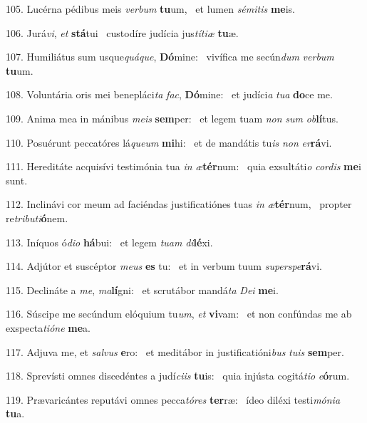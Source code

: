 105. Lucérna pédibus meis \textit{ver}\textit{bum} \textbf{tu}um, \ast\  et lumen \textit{sé}\textit{mi}\textit{tis} \textbf{me}is.\

106. Jurá\textit{vi}, \textit{et} \textbf{stá}tui \ast\  custodíre judícia jus\textit{tí}\textit{ti}\textit{æ} \textbf{tu}æ.\

107. Humiliátus sum usque\textit{quá}\textit{que}, \textbf{Dó}mine: \ast\  vivífica me secún\textit{dum} \textit{ver}\textit{bum} \textbf{tu}um.\

108. Voluntária oris mei benepláci\textit{ta} \textit{fac}, \textbf{Dó}mine: \ast\  et judíci\textit{a} \textit{tu}\textit{a} \textbf{do}ce me.\

109. Anima mea in mánibus \textit{me}\textit{is} \textbf{sem}per: \ast\  et legem tuam \textit{non} \textit{sum} \textit{ob}\textbf{lí}tus.\

110. Posuérunt peccatóres lá\textit{que}\textit{um} \textbf{mi}hi: \ast\  et de mandátis tu\textit{is} \textit{non} \textit{er}\textbf{rá}vi.\

111. Hereditáte acquisívi testimónia tua \textit{in} \textit{æ}\textbf{tér}num: \ast\  quia exsultáti\textit{o} \textit{cor}\textit{dis} \textbf{me}i sunt.\

112. Inclinávi cor meum ad faciéndas justificatiónes tuas \textit{in} \textit{æ}\textbf{tér}num, \ast\  propter re\textit{tri}\textit{bu}\textit{ti}\textbf{ó}nem.\

113. Iníquos ó\textit{di}\textit{o} \textbf{há}bui: \ast\  et legem \textit{tu}\textit{am} \textit{di}\textbf{lé}xi.\

114. Adjútor et suscéptor \textit{me}\textit{us} \textbf{es} tu: \ast\  et in verbum tuum \textit{su}\textit{per}\textit{spe}\textbf{rá}vi.\

115. Declináte a \textit{me}, \textit{ma}\textbf{lí}gni: \ast\  et scrutábor mandá\textit{ta} \textit{De}\textit{i} \textbf{me}i.\

116. Súscipe me secúndum elóquium tu\textit{um}, \textit{et} \textbf{vi}vam: \ast\  et non confúndas me ab exspecta\textit{ti}\textit{ó}\textit{ne} \textbf{me}a.\

117. Adjuva me, et \textit{sal}\textit{vus} \textbf{e}ro: \ast\  et meditábor in justificatióni\textit{bus} \textit{tu}\textit{is} \textbf{sem}per.\

118. Sprevísti omnes discedéntes a judí\textit{ci}\textit{is} \textbf{tu}is: \ast\  quia injústa cogitá\textit{ti}\textit{o} \textit{e}\textbf{ó}rum.\

119. Prævaricántes reputávi omnes pecca\textit{tó}\textit{res} \textbf{ter}ræ: \ast\  ídeo diléxi testi\textit{mó}\textit{ni}\textit{a} \textbf{tu}a.\

